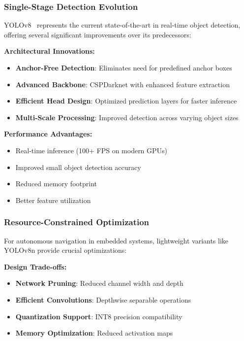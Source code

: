 \documentclass[12pt,oneside]{book}
\begin{document}
\subsubsection{Single-Stage Detection Evolution}
YOLOv8~\cite{jocher2023ultralytics} represents the current state-of-the-art in real-time object detection, offering several significant improvements over its predecessors:

\textbf{Architectural Innovations:}
\begin{itemize}
    \item \textbf{Anchor-Free Detection}: Eliminates need for predefined anchor boxes
    \item \textbf{Advanced Backbone}: CSPDarknet with enhanced feature extraction
    \item \textbf{Efficient Head Design}: Optimized prediction layers for faster inference
    \item \textbf{Multi-Scale Processing}: Improved detection across varying object sizes
\end{itemize}

\textbf{Performance Advantages:}
\begin{itemize}
    \item Real-time inference (100+ FPS on modern GPUs)
    \item Improved small object detection accuracy
    \item Reduced memory footprint
    \item Better feature utilization
\end{itemize}

\subsubsection{Resource-Constrained Optimization}
For autonomous navigation in embedded systems, lightweight variants like YOLOv8n provide crucial optimizations:

\textbf{Design Trade-offs:}
\begin{itemize}
    \item \textbf{Network Pruning}: Reduced channel width and depth
    \item \textbf{Efficient Convolutions}: Depthwise separable operations
    \item \textbf{Quantization Support}: INT8 precision compatibility
    \item \textbf{Memory Optimization}: Reduced activation maps
\end{itemize}
\end{document}
